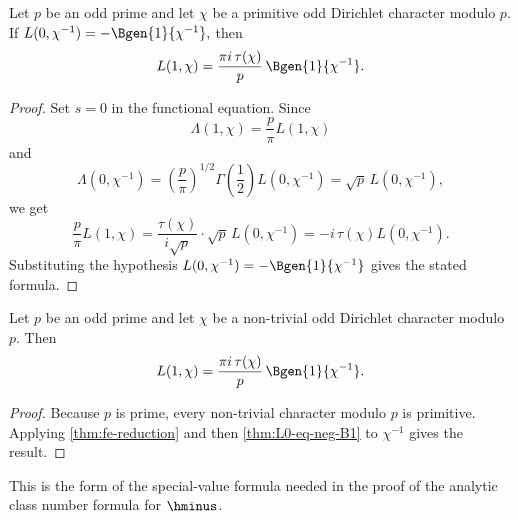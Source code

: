 \begin{proposition}\label{thm:fe-reduction}
  \leanok
Let $p$ be an odd prime and let $\chi$ be a primitive odd Dirichlet
character modulo $p$. If
\(
  L(0,\chi^{-1}) = -\Bgen{1}{\chi^{-1}},
\)
then
\[
  L(1,\chi) = \frac{\pi i\,\tau(\chi)}{p}\,\Bgen{1}{\chi^{-1}}.
\]
\end{proposition}

\begin{proof}\leanok
Set $s=0$ in the functional equation. Since
\[
  \Lambda(1,\chi)=\frac{p}{\pi}L(1,\chi)
\]
and
\[
  \Lambda(0,\chi^{-1})
  = \left(\frac{p}{\pi}\right)^{1/2}\Gamma\!\left(\frac12\right)L(0,\chi^{-1})
  = \sqrt p\,L(0,\chi^{-1}),
\]
we get
\[
  \frac{p}{\pi}L(1,\chi)
  = \frac{\tau(\chi)}{i\sqrt p}\cdot \sqrt p\,L(0,\chi^{-1})
  = -i\,\tau(\chi)L(0,\chi^{-1}).
\]
Substituting the hypothesis
\(
  L(0,\chi^{-1})=-\Bgen{1}{\chi^{-1}}
\)
gives the stated formula.
\end{proof}

\begin{corollary}[Odd character formula at \texorpdfstring{$s=1$}{s=1}]
  \label{cor:L1-odd}
  \leanok
Let $p$ be an odd prime and let $\chi$ be a non-trivial odd Dirichlet
character modulo $p$. Then
\[
  L(1,\chi) = \frac{\pi i\,\tau(\chi)}{p}\,\Bgen{1}{\chi^{-1}}.
\]
\end{corollary}

\begin{proof}\leanok
Because $p$ is prime, every non-trivial character modulo $p$ is primitive.
Applying \cref{thm:fe-reduction} and then
\cref{thm:L0-eq-neg-B1} to $\chi^{-1}$ gives the result.
\end{proof}

This is the form of the special-value formula needed in the proof of the
analytic class number formula for $\hminus$.
